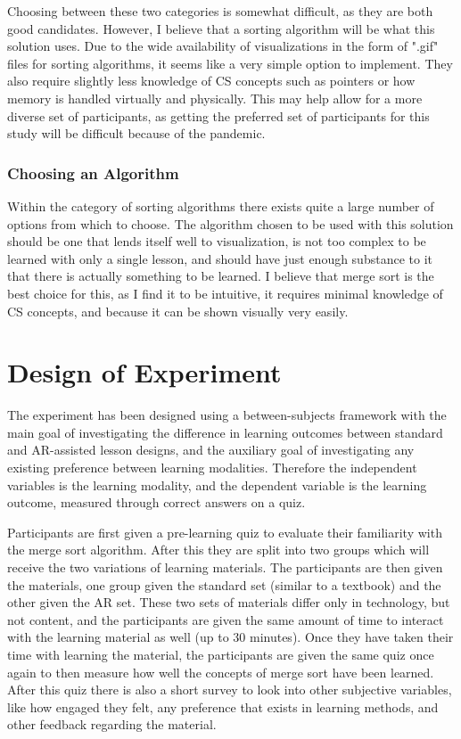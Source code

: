 \documentclass[sigconf]{acmart}
\begin{document}
Choosing between these two categories is somewhat difficult, as they are both good candidates. However, I believe that a sorting algorithm will be what this solution uses. Due to the wide availability of visualizations in the form of ".gif" files for sorting algorithms, it seems like a very simple option to implement. They also require slightly less knowledge of CS concepts such as pointers or how memory is handled virtually and physically. This may help allow for a more diverse set of participants, as getting the preferred set of participants for this study will be difficult because of the pandemic.

\subsubsection{Choosing an Algorithm}
Within the category of sorting algorithms there exists quite a large number of options from which to choose. The algorithm chosen to be used with this solution should be one that lends itself well to visualization, is not too complex to be learned with only a single lesson, and should have just enough substance to it that there is actually something to be learned. I believe that merge sort is the best choice for this, as I find it to be intuitive, it requires minimal knowledge of CS concepts, and because it can be shown visually very easily.

\section{Design of Experiment}
The experiment has been designed using a between-subjects framework with the main goal of investigating the difference in learning outcomes between standard and AR-assisted lesson designs, and the auxiliary goal of investigating any existing preference between learning modalities. Therefore the independent variables is the learning modality, and the dependent variable is the learning outcome, measured through correct answers on a quiz.

Participants are first given a pre-learning quiz to evaluate their familiarity with the merge sort algorithm. After this they are split into two groups which will receive the two variations of learning materials. The participants are then given the materials, one group given the standard set (similar to a textbook) and the other given the AR set. These two sets of materials differ only in technology, but not content, and the participants are given the same amount of time to interact with the learning material as well (up to 30 minutes). Once they have taken their time with learning the material, the participants are given the same quiz once again to then measure how well the concepts of merge sort have been learned. After this quiz there is also a short survey to look into other subjective variables, like how engaged they felt, any preference that exists in learning methods, and other feedback regarding the material.
\end{document}
